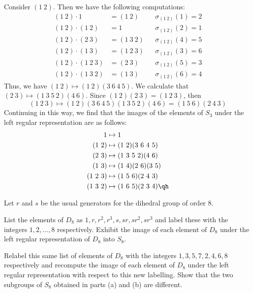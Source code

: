 \begin{sol}
	Consider $(1\ 2)$. Then we have the following computations:
	\begin{align*}
		(1\ 2) \cdot 1 & = (1\ 2) && \sigma_{(1\ 2)}(1) = 2 \\
		(1\ 2) \cdot (1\ 2) & = 1 && \sigma_{(1\ 2)}(2) = 1 \\
		(1\ 2) \cdot (2\ 3) & = (1\ 3\ 2) && \sigma_{(1\ 2)}(4) = 5 \\
		(1\ 2) \cdot (1\ 3) & = (1\ 2\ 3) && \sigma_{(1\ 2)}(3) = 6 \\
		(1\ 2) \cdot (1\ 2\ 3) & = (2\ 3) && \sigma_{(1\ 2)}(5) = 3 \\
		(1\ 2) \cdot (1\ 3\ 2) & = (1\ 3) && \sigma_{(1\ 2)}(6) = 4
	\end{align*}
	Thus, we have $(1\ 2) \mapsto (1\ 2)(3\ 6\ 4\ 5)$. We calculate that $(2\ 3) \mapsto (1\ 3\ 5\ 2)(4\ 6)$. Since $(1\ 2)(2\ 3) = (1\ 2\ 3)$, then
	\[(1\ 2\ 3) \mapsto (1\ 2)(3\ 6\ 4\ 5)(1\ 3\ 5\ 2)(4\ 6) = (1\ 5\ 6)(2\ 4\ 3)\]
	Continuing in this way, we find that the images of the elements of $S_3$ under the left regular representation are as follows:
	\begin{align*}
		1 & \mapsto 1 \\
		(1\ 2) & \mapsto (1\ 2)(3\ 6\ 4\ 5) \\
		(2\ 3) & \mapsto (1\ 3\ 5\ 2)(4\ 6) \\
		(1\ 3) & \mapsto (1\ 4)(2\ 6)(3\ 5) \\
		(1\ 2\ 3) & \mapsto (1\ 5\ 6)(2\ 4\ 3) \\
		(1\ 3\ 2) & \mapsto (1\ 6\ 5)(2\ 3\ 4) \qh
	\end{align*}
\end{sol}

\begin{exercise}
	\label{ex4.2.3} Let $r$ and $s$ be the usual generators for the dihedral group of order 8.
	\begin{subproblems}
		\item List the elements of $D_8$ as $1, r, r^2, r^3, s, sr, sr^2, sr^3$ and label these with the integers $1,2,\dots,8$ respectively. Exhibit the image of each element of $D_8$ under the left regular representation of $D_8$ into $S_8$.
		\item Relabel this same list of elements of $D_8$ with the integers $1,3,5,7,2,4,6,8$ respectively and recompute the image of each element of $D_8$ under the left regular representation with respect to this new labelling. Show that the two subgroups of $S_8$ obtained in parts (a) and (b) are different.
	\end{subproblems}
\end{exercise}

